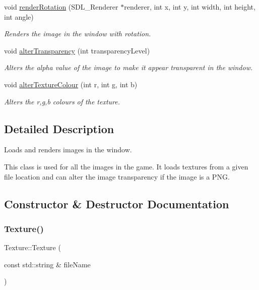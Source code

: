 \begin{DoxyCompactItemize}
\mbox{\label{class_texture_abadbea608d1cbfb2663e0f72f931ac47}} 
void \hyperlink{class_texture_abadbea608d1cbfb2663e0f72f931ac47}{render\+Rotation} (S\+D\+L\+\_\+\+Renderer $\ast$renderer, int x, int y, int width, int height, int angle)
\begin{DoxyCompactList}\small\item\em Renders the image in the window with rotation. \end{DoxyCompactList}\item 
\mbox{\label{class_texture_a5b56b0778a0417bddf0442aadad3a444}} 
void \hyperlink{class_texture_a5b56b0778a0417bddf0442aadad3a444}{alter\+Transparency} (int transparency\+Level)
\begin{DoxyCompactList}\small\item\em Alters the alpha value of the image to make it appear transparent in the window. \end{DoxyCompactList}\item 
\mbox{\label{class_texture_a9fa98f7326aebee23beb05167689faa8}} 
void \hyperlink{class_texture_a9fa98f7326aebee23beb05167689faa8}{alter\+Texture\+Colour} (int r, int g, int b)
\begin{DoxyCompactList}\small\item\em Alters the r,g,b colours of the texture. \end{DoxyCompactList}\end{DoxyCompactItemize}


\subsection{Detailed Description}
Loads and renders images in the window. 

This class is used for all the images in the game. It loads textures from a given file location and can alter the image transparency if the image is a P\+NG. 

\subsection{Constructor \& Destructor Documentation}
\mbox{\label{class_texture_ab303a4548e5c5822de490b99b5d3f928}} 
\subsubsection{\texorpdfstring{Texture()}{Texture()}}
{\footnotesize\ttfamily Texture\+::\+Texture (\begin{DoxyParamCaption}\item[{const std\+::string \&}]{file\+Name }\end{DoxyParamCaption})}



